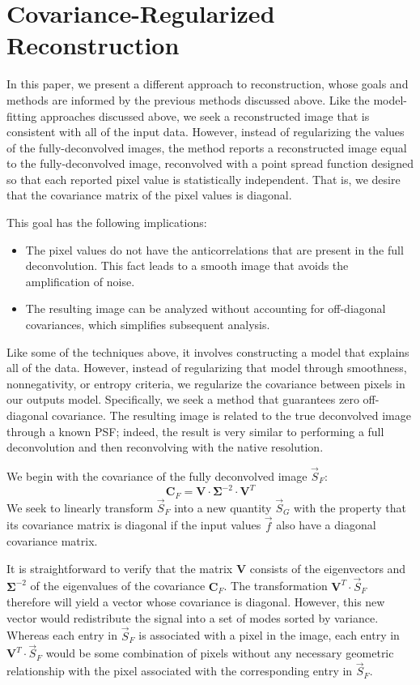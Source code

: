 \documentclass[twocolumn,tighten]{aastex61}
\begin{document}
\section{Covariance-Regularized Reconstruction}

In this paper, we present a different approach to reconstruction,
whose goals and methods are informed by the previous methods discussed
above. Like the model-fitting approaches discussed above, we seek a
reconstructed image that is consistent with all of the input
data. However, instead of regularizing the values of the
fully-deconvolved images, the method reports a reconstructed image
equal to the fully-deconvolved image, reconvolved with a point spread
function designed so that each reported pixel value is statistically
independent. That is, we desire that the covariance matrix of the
pixel values is diagonal.

This goal has the following implications:
\begin{itemize}
\item The pixel values do not have the anticorrelations that are
  present in the full deconvolution. This  fact leads to a smooth
  image that avoids the amplification of noise.
\item The resulting image can be analyzed without accounting for
  off-diagonal covariances, which simplifies subsequent analysis. 
\end{itemize}

Like some of the techniques above, it involves constructing a
model that explains all of the data. However, instead of regularizing
that model through smoothness, nonnegativity, or entropy criteria, we
regularize the covariance between pixels in our outputs
model. Specifically, we seek a method that guarantees zero
off-diagonal covariance. The resulting image is related to the true
deconvolved image through a known PSF; indeed, the result is very
similar to performing a full deconvolution and then reconvolving with
the native resolution.

We begin with the covariance of the fully deconvolved image
$\vec{S}_F$:
\begin{equation}
  \mathbf{C}_F = \mathbf{V}\cdot \mathbf{\Sigma}^{-2} \cdot \mathbf{V}^T
\end{equation}
We seek to linearly transform $\vec{S}_F$ into a new quantity
$\vec{S}_G$ with the property that its covariance matrix is diagonal
if the input values $\vec{f}$ also have a diagonal covariance matrix.

It is straightforward to verify that the matrix $\mathbf{V}$ consists
of the eigenvectors and $\mathbf{\Sigma}^{-2}$ of the eigenvalues of
the covariance $\mathbf{C}_F$. The transformation $\mathbf{V}^T \cdot
\vec{S}_F$ therefore will yield a vector whose covariance is
diagonal. However, this new vector would redistribute the signal into
a set of modes sorted by variance. Whereas each entry in $\vec{S}_F$
is associated with a pixel in the image, each entry in
$\mathbf{V}^T\cdot\vec{S}_F$ would be some combination of pixels
without any necessary geometric relationship with the pixel associated
with the corresponding entry in $\vec{S}_F$.
\end{document}

